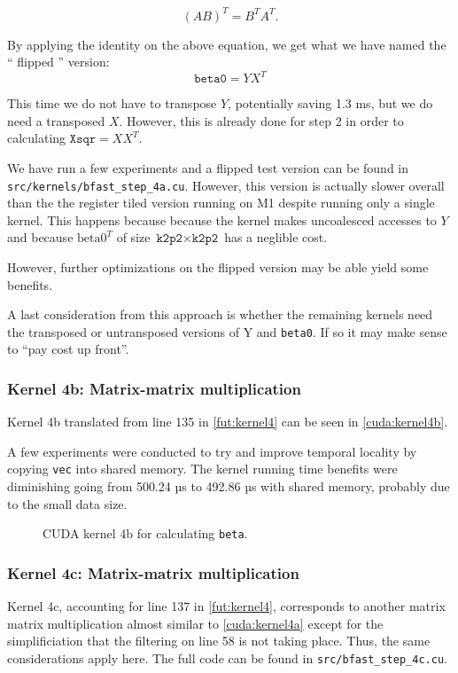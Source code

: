 \[ (AB)^T = B^T A^T. \]

By applying the identity on the above equation, we get what we have named the
\enquote{ flipped } version:
\[ \texttt{beta0} = YX^T \]

This time we do not have to transpose \(Y\), potentially saving 1.3 ms, but we
do need a transposed \(X\). However, this is already done for step 2 in order
to calculating \(\texttt{Xsqr}
= XX^T\).

We have run a few experiments and a flipped test version can be found in
\texttt{src/kernels/bfast\_step\_4a.cu}. However, this version is actually
slower overall than the the register tiled version running on M1 despite running
only a single kernel. This happens because because the kernel makes uncoalesced
accesses to \(Y\) and because \(\text{beta0}^T\) of size \(\texttt{k2p2} \times
\texttt{k2p2}\) has a neglible cost.

However, further optimizations on the flipped version may be able yield some
benefits.

A last consideration from this approach is whether the remaining kernels need
the transposed or untransposed versions of Y and \texttt{beta0}. If so it may
make sense to \enquote{pay cost up front}.

\subsubsection{Kernel 4b: Matrix-matrix multiplication}

Kernel 4b translated from line 135 in \autoref{fut:kernel4} can be seen in
\autoref{cuda:kernel4b}.

A few experiments were conducted to try and improve temporal locality by copying
\texttt{vec} into shared memory. The kernel running time benefits were
diminishing going from 500.24 µs to 492.86 µs with shared memory, probably due
to the small data size.


\begin{figure}[H]
    \centering
    \caption{CUDA kernel 4b for calculating \texttt{beta}.}
    \label{cuda:kernel4b}
\end{figure}


\subsubsection{Kernel 4c: Matrix-matrix multiplication}

Kernel 4c, accounting for line 137 in \autoref{fut:kernel4}, corresponds to
another matrix matrix multiplication almost similar to \autoref{cuda:kernel4a}
except for the simplificiation that the filtering on line 58 is not taking
place. Thus, the same considerations apply here. The full code can be found in
\texttt{src/bfast\_step\_4c.cu}.





